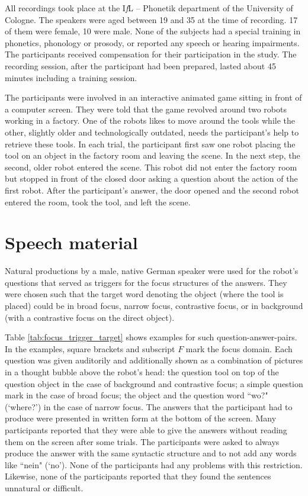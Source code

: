 All recordings took place at the I\emph{f}L -- Phonetik department of the University of Cologne. The speakers were aged between 19 and 35 at the time of recording. 17 of them were female, 10 were male. None of the subjects had a special training in phonetics, phonology or prosody, or reported any speech or hearing impairments. The participants received compensation for their participation in the study. The recording session, after the participant had been prepared, lasted about 45 minutes including a training session.

The participants were involved in an interactive animated game sitting in front of a computer screen. They were told that the game revolved around two robots working in a factory. One of the robots likes to move around the tools while the other, slightly older and technologically outdated, needs the participant's help to retrieve these tools. In each trial, the participant first saw one robot placing the tool on an object in the factory room and leaving the scene. In the next step, the second, older robot entered the scene. This robot did not enter the factory room but stopped in front of the closed door asking a question about the action of the first robot. After the participant's answer, the door opened and the second robot entered the room, took the tool, and left the scene.

\section{Speech material}

Natural productions by a male, native German speaker were used for the robot's questions that served as triggers for the focus structures of the answers. They were chosen such that the target word denoting the object (where the tool is placed) could be in broad focus, narrow focus, contrastive focus, or in background (with a contrastive focus on the direct object). 

Table \ref{tab:focus_trigger_target} shows examples for such question-answer-pairs. In the examples, square brackets and subscript $F$ mark the focus domain. Each question was given auditorily and additionally shown as a combination of pictures in a thought bubble above the robot's head: the question tool on top of the question object in the case of background and contrastive focus; a simple question mark in the case of broad focus; the object and the question word ``wo?" (`where?') in the case of narrow focus. The answers that the participant had to produce were presented in written form at the bottom of the screen. Many participants reported that they were able to give the answers without reading them on the screen after some trials. The participants were asked to always produce the answer with the same syntactic structure and to not add any words like ``nein" (`no'). None of the participants had any problems with this restriction. Likewise, none of the participants reported that they found the sentences unnatural or difficult.

